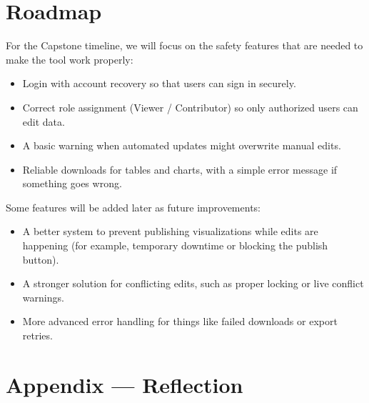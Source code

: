 \documentclass{article}
\begin{document}
\section{Roadmap}

For the Capstone timeline, we will focus on the safety features that are needed to make the tool work properly:

\begin{itemize}
    \item Login with account recovery so that users can sign in securely.
    \item Correct role assignment (Viewer / Contributor) so only authorized users can edit data.
    \item A basic warning when automated updates might overwrite manual edits.
    \item Reliable downloads for tables and charts, with a simple error message if something goes wrong.
\end{itemize}

Some features will be added later as future improvements:

\begin{itemize}
    \item A better system to prevent publishing visualizations while edits are happening (for example, temporary downtime or blocking the publish button).
    \item A stronger solution for conflicting edits, such as proper locking or live conflict warnings.
    \item More advanced error handling for things like failed downloads or export retries.
\end{itemize}


\newpage{}

\section*{Appendix --- Reflection}



\end{document}
